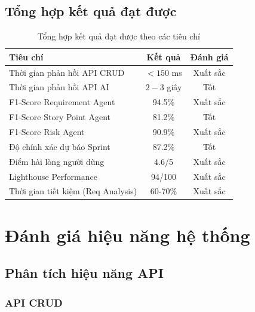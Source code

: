 \documentclass[12pt,a4paper]{report}
\begin{document}
\subsection{Tổng hợp kết quả đạt được}

\begin{table}[H]
\centering
\caption{Tổng hợp kết quả đạt được theo các tiêu chí}
\begin{tabular}{|p{5cm}|c|c|}
\hline
\textbf{Tiêu chí} & \textbf{Kết quả} & \textbf{Đánh giá} \\
\hline
Thời gian phản hồi API CRUD & $< 150$ ms & Xuất sắc \\
\hline
Thời gian phản hồi API AI & $2 - 3$ giây & Tốt \\
\hline
F1-Score Requirement Agent & 94.5\% & Xuất sắc \\
\hline
F1-Score Story Point Agent & 81.2\% & Tốt \\
\hline
F1-Score Risk Agent & 90.9\% & Xuất sắc \\
\hline
Độ chính xác dự báo Sprint & 87.2\% & Tốt \\
\hline
Điểm hài lòng người dùng & 4.6/5 & Xuất sắc \\
\hline
Lighthouse Performance & 94/100 & Xuất sắc \\
\hline
Thời gian tiết kiệm (Req Analysis) & 60-70\% & Xuất sắc \\
\hline
\end{tabular}
\label{tab:results_summary}
\end{table}

\section{Đánh giá hiệu năng hệ thống}

\subsection{Phân tích hiệu năng API}

\subsubsection{API CRUD}
\end{document}

